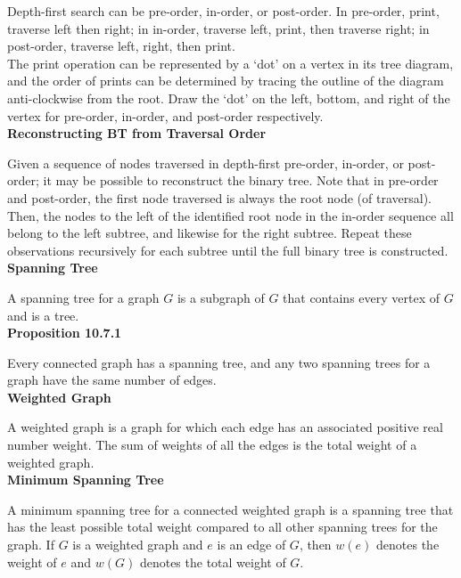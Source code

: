 \documentclass[a4paper]{article}
\newcommand{\subheading}[1]{{\scriptsize\textbf{#1}}}
\begin{document}
\begin{multicols*}{4}
Depth-first search can be pre-order, in-order, or post-order. In pre-order,
print, traverse left then right; in in-order, traverse left, print, then
traverse right; in post-order, traverse left, right, then print. \\

The print operation can be represented by a `dot' on a vertex in its tree
diagram, and the order of prints can be determined by tracing the outline of the
diagram anti-clockwise from the root. Draw the `dot' on the left, bottom, and
right of the vertex for pre-order, in-order, and post-order respectively. \\

\subheading{Reconstructing BT from Traversal Order}

Given a sequence of nodes traversed in depth-first pre-order, in-order, or
post-order; it may be possible to reconstruct the binary tree. Note that in
pre-order and post-order, the first node traversed is always the root node (of
traversal). Then, the nodes to the left of the identified root node in the
in-order sequence all belong to the left subtree, and likewise for the right
subtree. Repeat these observations recursively for each subtree until the full
binary tree is constructed.\\

\subheading{Spanning Tree}

A spanning tree for a graph $G$ is a subgraph of $G$ that contains every vertex
of $G$ and is a tree.\\

\subheading{Proposition 10.7.1}

Every connected graph has a spanning tree, and any two spanning trees for a
graph have the same number of edges.\\

\subheading{Weighted Graph}

A weighted graph is a graph for which each edge has an associated positive real
number weight. The sum of weights of all the edges is the total weight of a
weighted graph.\\

\subheading{Minimum Spanning Tree}

A minimum spanning tree for a connected weighted graph is a spanning tree that
has the least possible total weight compared to all other spanning trees for the
graph. If $G$ is a weighted graph and $e$ is an edge of $G$, then $w(e)$ denotes
the weight of $e$ and $w(G)$ denotes the total weight of $G$.\\


\end{multicols*}
\end{document}
